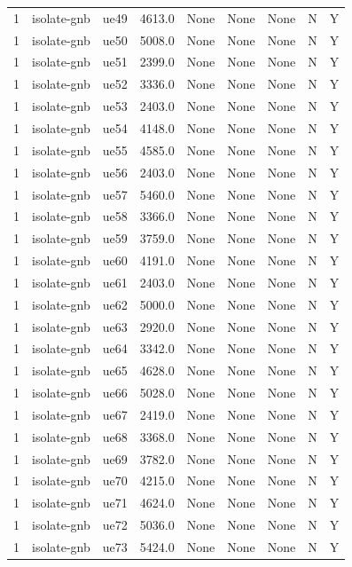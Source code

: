 \begin{table}[ht]
\begin{tabular}{|c|c|c|c|c|c|c|c|c|}
1 & isolate-gnb & ue49 & 4613.0 & None & None & None & N & Y \\
1 & isolate-gnb & ue50 & 5008.0 & None & None & None & N & Y \\
1 & isolate-gnb & ue51 & 2399.0 & None & None & None & N & Y \\
1 & isolate-gnb & ue52 & 3336.0 & None & None & None & N & Y \\
1 & isolate-gnb & ue53 & 2403.0 & None & None & None & N & Y \\
1 & isolate-gnb & ue54 & 4148.0 & None & None & None & N & Y \\
1 & isolate-gnb & ue55 & 4585.0 & None & None & None & N & Y \\
1 & isolate-gnb & ue56 & 2403.0 & None & None & None & N & Y \\
1 & isolate-gnb & ue57 & 5460.0 & None & None & None & N & Y \\
1 & isolate-gnb & ue58 & 3366.0 & None & None & None & N & Y \\
1 & isolate-gnb & ue59 & 3759.0 & None & None & None & N & Y \\
1 & isolate-gnb & ue60 & 4191.0 & None & None & None & N & Y \\
1 & isolate-gnb & ue61 & 2403.0 & None & None & None & N & Y \\
1 & isolate-gnb & ue62 & 5000.0 & None & None & None & N & Y \\
1 & isolate-gnb & ue63 & 2920.0 & None & None & None & N & Y \\
1 & isolate-gnb & ue64 & 3342.0 & None & None & None & N & Y \\
1 & isolate-gnb & ue65 & 4628.0 & None & None & None & N & Y \\
1 & isolate-gnb & ue66 & 5028.0 & None & None & None & N & Y \\
1 & isolate-gnb & ue67 & 2419.0 & None & None & None & N & Y \\
1 & isolate-gnb & ue68 & 3368.0 & None & None & None & N & Y \\
1 & isolate-gnb & ue69 & 3782.0 & None & None & None & N & Y \\
1 & isolate-gnb & ue70 & 4215.0 & None & None & None & N & Y \\
1 & isolate-gnb & ue71 & 4624.0 & None & None & None & N & Y \\
1 & isolate-gnb & ue72 & 5036.0 & None & None & None & N & Y \\
1 & isolate-gnb & ue73 & 5424.0 & None & None & None & N & Y \\

\end{tabular}
\end{table}
